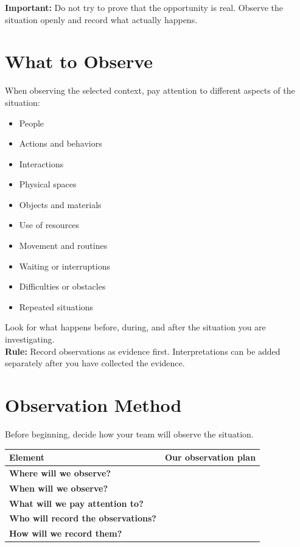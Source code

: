 \documentclass[12pt,a4paper]{article}
\begin{document}
	\vspace{0.2cm}
	
	\textbf{Important:} Do not try to prove that the opportunity is real. Observe the situation openly and record what actually happens.
	
	\section*{What to Observe}
	
	When observing the selected context, pay attention to different aspects of the situation:
	
	\begin{multicols}{2}
		\begin{itemize}[leftmargin=0.6cm,itemsep=0pt]
			\item People
			\item Actions and behaviors
			\item Interactions
			\item Physical spaces
			\item Objects and materials
			\item Use of resources
			\item Movement and routines
			\item Waiting or interruptions
			\item Difficulties or obstacles
			\item Repeated situations
		\end{itemize}
	\end{multicols}
	
	Look for what happens before, during, and after the situation you are investigating. \\
	
	
	\textbf{Rule:} Record observations as evidence first. Interpretations can be added separately after you have collected the evidence.
	
	\section*{Observation Method}
	
	Before beginning, decide how your team will observe the situation.
	
	\begin{center}
		\small
		\begin{tabular}{|L{0.30\textwidth}|L{0.55\textwidth}|}
			\hline
			\textbf{Element} & \textbf{Our observation plan} \\
			\hline
			\textbf{Where will we observe?} & \rule{0pt}{0.55cm} \\
			\hline
			\textbf{When will we observe?} & \rule{0pt}{0.55cm} \\
			\hline
			\textbf{What will we pay attention to?} & \rule{0pt}{0.7cm} \\
			\hline
			\textbf{Who will record the observations?} & \rule{0pt}{0.55cm} \\
			\hline
			\textbf{How will we record them?} & \rule{0pt}{0.55cm} \\
			\hline
		\end{tabular}
	\end{center}
	
\end{document}
